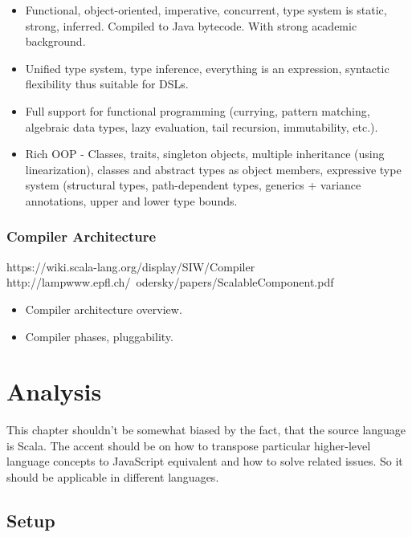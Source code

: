 \documentclass[12pt,a4paper]{report}
\begin{document}
\begin{itemize}
\item Functional, object-oriented, imperative, concurrent, type system is static, strong, inferred. Compiled to Java bytecode. With strong academic background.
\item Unified type system, type inference, everything is an expression, syntactic flexibility thus suitable for DSLs.
\item Full support for functional programming (currying, pattern matching, algebraic data types, lazy evaluation, tail recursion, immutability, etc.).
\item Rich OOP - Classes, traits, singleton objects, multiple inheritance (using linearization), classes and abstract types as object members, expressive type system (structural types, path-dependent types, generics + variance annotations, upper and lower type bounds.
\end{itemize}

\subsection{Compiler Architecture}

https://wiki.scala-lang.org/display/SIW/Compiler
http://lampwww.epfl.ch/~odersky/papers/ScalableComponent.pdf

\begin{itemize}
\item Compiler architecture overview.
\item Compiler phases, pluggability.
\end{itemize}



\chapter{Analysis}

This chapter shouldn't be somewhat biased by the fact, that the source language is Scala. The accent should be on how to transpose particular higher-level language concepts to JavaScript equivalent and how to solve related issues. So it should be applicable in different languages.

\section{Setup}
\end{document}
